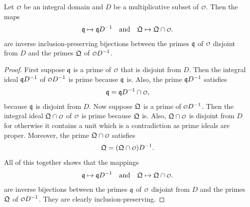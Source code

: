     \begin{proposition}\label{prop:localization_prime_bijection}
      Let \(\smc{O}\) be an integral domain and \(D\) be a multiplicative subset of \(\smc{O}\). Then the maps
      \[
        \mf{q} \mapsto \mf{q}D^{-1} \quad \text{and} \quad \mf{Q} \mapsto \mf{Q} \cap \smc{O}.
      \]
      are inverse inclusion-preserving bijections between the primes \(\mathfrak{q}\) of \(\smc{O}\) disjoint from \(D\) and the primes \(\mathfrak{Q}\) of \(\smc{O}D^{-1}\).
    \end{proposition}
    \begin{proof}
      First suppose \(\mathfrak{q}\) is a prime of \(\smc{O}\) that is disjoint from \(D\). Then the integral ideal \(\mathfrak{q}D^{-1}\) of \(\smc{O}D^{-1}\) is prime because \(\mathfrak{q}\) is. Also, the prime \(\mathfrak{q}D^{-1}\) satisfies
      \[
        \mf{q} = \mf{q}D^{-1} \cap \smc{O},
      \]
      because \(\mathfrak{q}\) is disjoint from \(D\). Now suppose \(\mathfrak{Q}\) is a prime of \(\smc{O}D^{-1}\). Then the integral ideal \(\mf{Q} \cap \smc{O}\) of \(\smc{O}\) is prime because \(\mathfrak{Q}\) is. Also, \(\mf{Q} \cap \smc{O}\) is disjoint from \(D\) for otherwise it contains a unit which is a contradiction as prime ideals are proper. Moreover, the prime \(\mf{Q} \cap \smc{O}\) satisfies
      \[
        \mf{Q} = (\mf{Q} \cap \smc{O})D^{-1}.
      \]
      All of this together shows that the mappings
      \[
        \mf{q} \mapsto \mf{q}D^{-1} \quad \text{and} \quad \mf{Q} \mapsto \mf{Q} \cap \smc{O}.
      \]
      are inverse bijections between the primes \(\mathfrak{q}\) of \(\smc{O}\) disjoint from \(D\) and the primes \(\mathfrak{Q}\) of \(\smc{O}D^{-1}\). They are clearly inclusion-preserving.
    \end{proof}

